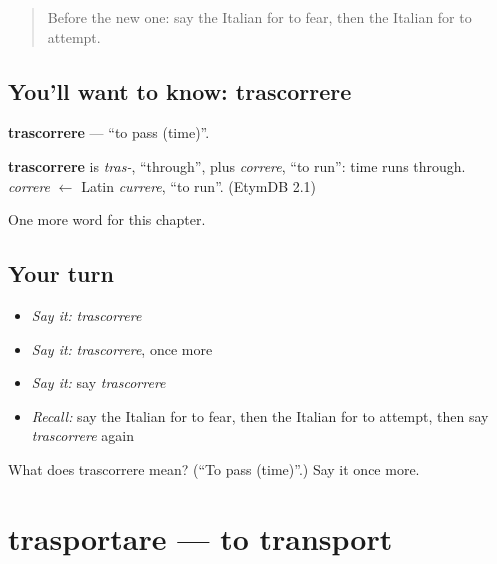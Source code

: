 \label{lesson:IT-C148-trascorrere}



\begin{quote}
Before the new one: say the Italian for to fear, then the Italian for to attempt.
\end{quote}

\subsection*{You'll want to know: trascorrere}
\textbf{trascorrere} — \textquotedblleft{}to pass (time)\textquotedblright{}.

\begin{cousinweb}
\textbf{trascorrere} is \emph{tras-}, \textquotedblleft{}through\textquotedblright{}, plus \emph{correre}, \textquotedblleft{}to run\textquotedblright{}: time runs through. \emph{correre} $\leftarrow$ Latin \emph{currere}, \textquotedblleft{}to run\textquotedblright{}. (EtymDB 2.1)
\end{cousinweb}

\begin{grammarlens}[title={What you've built}]
One more word for this chapter.
\end{grammarlens}

\subsection*{Your turn}
\begin{itemize}
\raggedright
  \item \emph{Say it:} \emph{trascorrere}
  \item \emph{Say it:} \emph{trascorrere}, once more
  \item \emph{Say it:} say \emph{trascorrere}
  \item \emph{Recall:} say the Italian for to fear, then the Italian for to attempt, then say \emph{trascorrere} again
\end{itemize}

\begin{tcolorbox}[breakable,colback=teal!4,colframe=teal!35!black,title={Before you move on}]
What does trascorrere mean? (\textquotedblleft{}To pass (time)\textquotedblright{}.) Say it once more.
\end{tcolorbox}
\section[trasportare]{trasportare — to transport}

